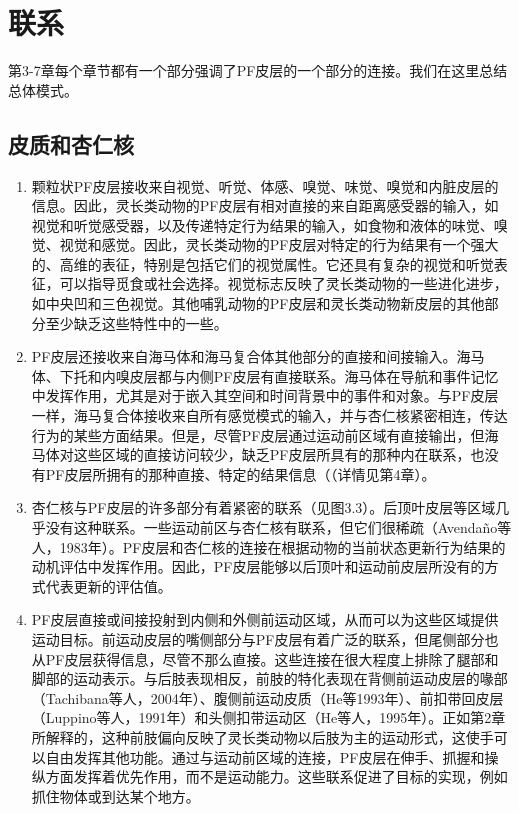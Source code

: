 \section{联系}
\par
第3-7章每个章节都有一个部分强调了PF皮层的一个部分的连接。我们在这里总结总体模式。

\subsection{皮质和杏仁核}
\begin{enumerate}
\item 颗粒状PF皮层接收来自视觉、听觉、体感、嗅觉、味觉、嗅觉和内脏皮层的信息。因此，灵长类动物的PF皮层有相对直接的来自距离感受器的输入，如视觉和听觉感受器，以及传递特定行为结果的输入，如食物和液体的味觉、嗅觉、视觉和感觉。因此，灵长类动物的PF皮层对特定的行为结果有一个强大的、高维的表征，特别是包括它们的视觉属性。它还具有复杂的视觉和听觉表征，可以指导觅食或社会选择。视觉标志反映了灵长类动物的一些进化进步，如中央凹和三色视觉。其他哺乳动物的PF皮层和灵长类动物新皮层的其他部分至少缺乏这些特性中的一些。

\item PF皮层还接收来自海马体和海马复合体其他部分的直接和间接输入。海马体、下托和内嗅皮层都与内侧PF皮层有直接联系。海马体在导航和事件记忆中发挥作用，尤其是对于嵌入其空间和时间背景中的事件和对象。与PF皮层一样，海马复合体接收来自所有感觉模式的输入，并与杏仁核紧密相连，传达行为的某些方面结果。但是，尽管PF皮层通过运动前区域有直接输出，但海马体对这些区域的直接访问较少，缺乏PF皮层所具有的那种内在联系，也没有PF皮层所拥有的那种直接、特定的结果信息（（详情见第4章）。

\item 杏仁核与PF皮层的许多部分有着紧密的联系（见图3.3）。后顶叶皮层等区域几乎没有这种联系。一些运动前区与杏仁核有联系，但它们很稀疏（Avendaño等人，1983年）。PF皮层和杏仁核的连接在根据动物的当前状态更新行为结果的动机评估中发挥作用。因此，PF皮层能够以后顶叶和运动前皮层所没有的方式代表更新的评估值。

\item PF皮层直接或间接投射到内侧和外侧前运动区域，从而可以为这些区域提供运动目标。前运动皮层的嘴侧部分与PF皮层有着广泛的联系，但尾侧部分也从PF皮层获得信息，尽管不那么直接。这些连接在很大程度上排除了腿部和脚部的运动表示。与后肢表现相反，前肢的特化表现在背侧前运动皮层的喙部（Tachibana等人，2004年）、腹侧前运动皮质（He等1993年）、前扣带回皮层（Luppino等人，1991年）和头侧扣带运动区（He等人，1995年）。正如第2章所解释的，这种前肢偏向反映了灵长类动物以后肢为主的运动形式，这使手可以自由发挥其他功能。通过与运动前区域的连接，PF皮层在伸手、抓握和操纵方面发挥着优先作用，而不是运动能力。这些联系促进了目标的实现，例如抓住物体或到达某个地方。


\end{enumerate}
